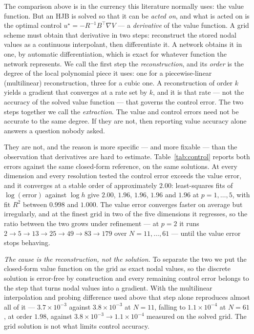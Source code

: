 \documentclass[conference]{IEEEtran}
\begin{document}
The comparison above is in the currency this literature normally uses: the value function. But an
HJB is solved so that it can be \emph{acted on}, and what is acted on is the optimal control
$u^\star = -R^{-1}B^\top \nabla V$ --- a \emph{derivative} of the value function. A grid scheme
must obtain that derivative in two steps: reconstruct the stored nodal values as a continuous
interpolant, then differentiate it. A network obtains it in one, by automatic
differentiation, which is exact for whatever function the network represents. We call the first
step the \emph{reconstruction}, and its \emph{order} is the degree of the local polynomial piece
it uses: one for a piecewise-linear (multilinear) reconstruction, three for a cubic one. A
reconstruction of order $k$ yields a gradient that converges at a rate set by $k$, and it is that
rate --- not the accuracy of the solved value function --- that governs the control error. The two
steps together we call the \emph{extraction}. The value and control errors need not be
accurate to the same degree. If they are not, then reporting value accuracy alone answers a
question nobody asked.

They are not, and the reason is more specific --- and more fixable --- than the observation that
derivatives are hard to estimate. Table~\ref{tab:control} reports both errors against the same
closed-form reference, on the same solutions. At every dimension and every resolution tested the
control error exceeds the value error, and it converges at a stable order of approximately $2.00$:
least-squares fits of $\log(\text{error})$ against $\log h$ give $2.00$, $1.96$, $1.96$, $1.96$
and $1.96$ at $p = 1,\dots,5$, with fit $R^2$ between $0.998$ and $1.000$. The value error
converges faster on average but irregularly, and at the finest grid in two of the five dimensions
it regresses, so the ratio between the two grows under refinement --- at $p=2$ it runs
$2 \to 5 \to 13 \to 25 \to 49 \to 83 \to 179$ over $N = 11,\dots,61$ --- until the value error
stops behaving.

\emph{The cause is the reconstruction, not the solution.} To separate the two we put the
closed-form value function on the grid as exact nodal values, so the discrete solution is
error-free by construction and every remaining control error belongs to the step that turns nodal
values into a gradient. With the multilinear interpolation and probing difference used above that
step alone reproduces almost all of it --- $3.7\times10^{-3}$ against $3.8\times10^{-3}$ at $N=11$,
falling to
$1.1\times10^{-4}$ at $N=61$, at order $1.98$, against $3.8\times10^{-3} \to 1.1\times10^{-4}$
measured on the solved grid. The grid solution is not what limits control accuracy.
\end{document}
